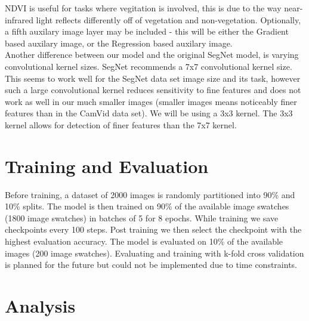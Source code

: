 \documentclass[12pt]{article}
\begin{document}
NDVI is useful for tasks where vegitation is involved, this is due to the way near-infrared light reflects differently off of vegetation and non-vegetation. Optionally, a fifth auxilary image layer may be included - this will be either the Gradient based auxilary image, or the Regression based auxilary image.
\\

Another difference between our model and the original SegNet model, is varying convolutional kernel sizes. SegNet recommends a 7x7 convolutional kernel size. This seems to work well for the SegNet data set image size and its task, however such a large convolutional kernel reduces sensitivity to fine features and does not work as well in our much smaller images (smaller images means noticeably finer features than in the CamVid data set). We will be using a 3x3 kernel. The 3x3 kernel allows for detection of finer features than the 7x7 kernel. 

\section{Training and Evaluation}
Before training, a dataset of 2000 images is randomly partitioned into 90\% and 10\% splits. The model is then trained on 90\% of the available image swatches (1800 image swatches) in batches of 5 for 8 epochs. While training we save checkpoints every 100 steps. Post training we then select the checkpoint with the highest evaluation accuracy. The model is evaluated on 10\% of the available images (200 image swatches). Evaluating and training with k-fold cross validation is planned for the future but could not be implemented due to time constraints.

\section{Analysis}

\begin{figure}[!htb]
\end{figure}
\end{document}
